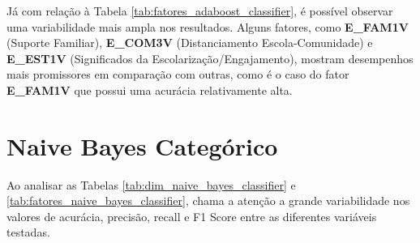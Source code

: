 Já com relação à Tabela \ref{tab:fatores_adaboost_classifier}, é possível observar uma variabilidade mais ampla nos resultados. Alguns fatores, como \textbf{E\_FAM1V} (Suporte Familiar), \textbf{E\_COM3V} (Distanciamento Escola-Comunidade) e \textbf{E\_EST1V} (Significados da Escolarização/Engajamento), mostram desempenhos mais promissores em comparação com outras, como é o caso do fator \textbf{E\_FAM1V} que possui uma acurácia relativamente alta.



\section{Naive Bayes Categórico}

Ao analisar as Tabelas \ref{tab:dim_naive_bayes_classifier} e \ref{tab:fatores_naive_bayes_classifier}, chama a atenção a grande variabilidade nos valores de acurácia, precisão, recall e F1 Score entre as diferentes variáveis testadas.

\begin{table}[ht]
\caption{Dimensões sendo testadas no modelo Naive Bayes Categórico}
    \centering
    \label{tab:dim_naive_bayes_classifier}
\end{table}

